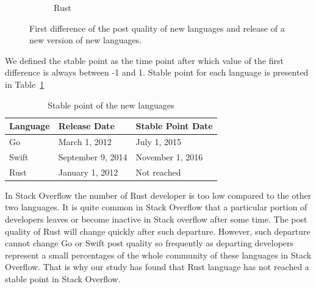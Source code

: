 \begin{figure}[htbp]
\begin{subfigure}{0.6\textwidth}
\caption{Rust}
\label{fig:Rust_FDR}
\end{subfigure}
\caption{First difference of the post quality of new languages and release of a new version of new languages.}
\label{First difference and release}
\end{figure}

We defined the stable point as the time point after which value of the first difference is always between -1 and 1. Stable point for each language is presented in Table~\ref{table:Stable point}

\begin{table}[htbp]
\centering
\caption{Stable point of the new languages}
\begin{tabular}{|l|l|l|}
\hline
Language & Release Date & Stable Point Date  \\ \hline
Go & March 1, 2012 & July 1, 2015\\ \hline
Swift & September 9, 2014 & November 1, 2016\\ \hline
Rust & January 1, 2012 & Not reached \\ \hline
\end{tabular}
\label{table:Stable point}
\end{table}

In Stack Overflow the number of Rust developer is too low compared to the other two languages. It is quite common in Stack Overflow that a particular portion of developers leaves or become inactive in  Stack overflow after some time. The post quality of Rust will change quickly after such departure. However, such departure cannot change Go or Swift post quality so frequently as departing developers represent a small percentages of the whole community of these languages in Stack Overflow. That is why our study has found that Rust language has not reached a stable point in Stack Overflow.



